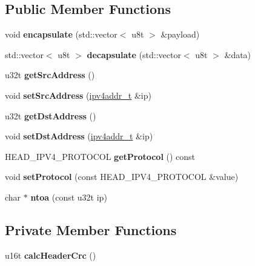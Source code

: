 \subsection*{Public Member Functions}
\begin{DoxyCompactItemize}
\item 
\mbox{\label{classIPv4_a1a9cf95c0b539638ccf87ec9540d1f5f}} 
void {\bfseries encapsulate} (std\+::vector$<$ u8t $>$ \&payload)
\item 
\mbox{\label{classIPv4_ac755be8eb652472e2976200f4c7112da}} 
std\+::vector$<$ u8t $>$ {\bfseries decapsulate} (std\+::vector$<$ u8t $>$ \&data)
\item 
\mbox{\label{classIPv4_aee57f9b38cf587fd7580324b4e0cf363}} 
u32t {\bfseries get\+Src\+Address} ()
\item 
\mbox{\label{classIPv4_a4b2067f9ec3bc10827b005a41ab8629c}} 
void {\bfseries set\+Src\+Address} (\hyperlink{unionipv4addr__t}{ipv4addr\+\_\+t} \&ip)
\item 
\mbox{\label{classIPv4_a3d00ed1f1cbee5b83110c896b785cf2a}} 
u32t {\bfseries get\+Dst\+Address} ()
\item 
\mbox{\label{classIPv4_afdf051ffbaafe88e789a222f39a75226}} 
void {\bfseries set\+Dst\+Address} (\hyperlink{unionipv4addr__t}{ipv4addr\+\_\+t} \&ip)
\item 
\mbox{\label{classIPv4_abd91126dd9d1f07b31e42b7df0d5f210}} 
H\+E\+A\+D\+\_\+\+I\+P\+V4\+\_\+\+P\+R\+O\+T\+O\+C\+OL {\bfseries get\+Protocol} () const
\item 
\mbox{\label{classIPv4_ac157b4db97d939fbe2c3f3ae0ed1425a}} 
void {\bfseries set\+Protocol} (const H\+E\+A\+D\+\_\+\+I\+P\+V4\+\_\+\+P\+R\+O\+T\+O\+C\+OL \&value)
\item 
\mbox{\label{classIPv4_a46bc1d4063db256e32195873bc52ba6a}} 
char $\ast$ {\bfseries ntoa} (const u32t ip)
\end{DoxyCompactItemize}
\subsection*{Private Member Functions}
\begin{DoxyCompactItemize}
\item 
\mbox{\label{classIPv4_a302dbff73ecbbdf99d3552fb996362b9}} 
u16t {\bfseries calc\+Header\+Crc} ()
\end{DoxyCompactItemize}
